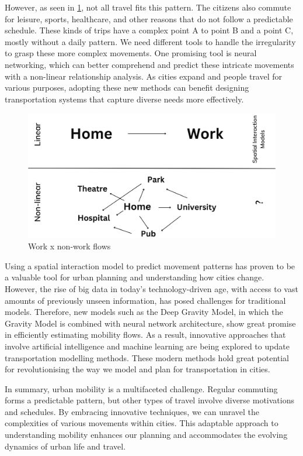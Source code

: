     However, as seen in \ref{fig: context}, not all travel fits this pattern. The citizens also commute for leisure, sports, healthcare, and other reasons that do not follow a predictable schedule. These kinds of trips have a complex point A to point B and a point C, mostly without a daily pattern. We need different tools to handle the irregularity to grasp these more complex movements. One promising tool is neural networking, which can better comprehend and predict these intricate movements with a non-linear relationship analysis. As cities expand and people travel for various purposes, adopting these new methods can benefit designing transportation systems that capture diverse needs more effectively.
   
    \begin{figure}[H]
        \centering
        \includegraphics[width=12cm]{Images/context.png}
        \caption{Work x non-work flows}
        \label{fig: context}
    \end{figure}

   Using a spatial interaction model to predict movement patterns has proven to be a valuable tool for urban planning and understanding how cities change. However, the rise of big data in today's technology-driven age, with access to vast amounts of previously unseen information, has posed challenges for traditional models. Therefore, new models such as the Deep Gravity Model, in which the Gravity Model is combined with neural network architecture, show great promise in efficiently estimating mobility flows. As a result, innovative approaches that involve artificial intelligence and machine learning are being explored to update transportation modelling methods. These modern methods hold great potential for revolutionising the way we model and plan for transportation in cities.

In summary, urban mobility is a multifaceted challenge. Regular commuting forms a predictable pattern, but other types of travel involve diverse motivations and schedules. By embracing innovative techniques, we can unravel the complexities of various movements within cities. This adaptable approach to understanding mobility enhances our planning and accommodates the evolving dynamics of urban life and travel.
    
